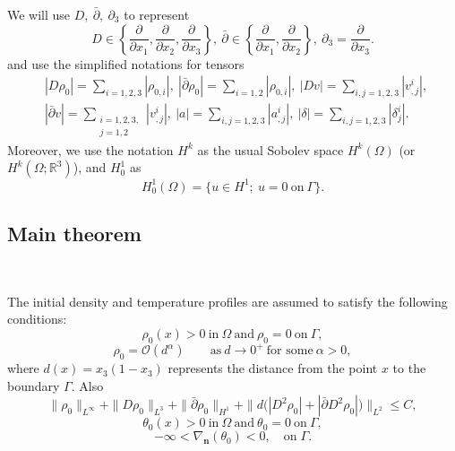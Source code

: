 \documentclass[12pt,a4paper]{amsart}
\numberwithin{equation}{section}
\theoremstyle{plain}
\theoremstyle{definition}
\newcommand{\bpartial}{\bar{\partial}}
\begin{document}
We will use $D,\ \bpartial,\ \partial_3$ to represent
$$
D \in \left\{\frac{\partial}{\partial x_1}, \frac{\partial}{\partial x_2}, \frac{\partial}{\partial x_3} \right\},~
\bpartial\in\left\{\frac{\partial}{\partial x_1}, \frac{\partial}{\partial x_2}\right\},~\partial_3=\frac{\partial}{\partial x_3}.
$$ 
and use the simplified notations for tensors 
\begin{align*}
&|D\rho_0|=\sum\limits_{i=1,2,3}|\rho_{0,i}|,~
|\bpartial\rho_0|=\sum\limits_{i=1,2}|\rho_{0,i}|,~|Dv|=\sum\limits_{i,j=1,2,3}|v^i_{,j}|,~\\
&|\bpartial v|=\sum\limits_{\substack{i=1,2,3,\\ j=1,2}}|v^i_{,j}|,~
|a|=\sum\limits_{i,j=1,2,3}|a^i_{,j}|,~|\delta|=\sum\limits_{i,j=1,2,3}|\delta^i_{j}|.
\end{align*}
Moreover, we use the notation $H^k$ as the usual Sobolev space $H^k(\Omega)$ (or $H^k(\Omega; \mathbb{R}^3)$), and $H^1_0$ as
$$
H^1_0(\Omega)=\{u\in H^1;~ u=0~\text{on}~\Gamma\}.
$$

\subsection{Main theorem}~

The initial density and temperature profiles are assumed to satisfy the following conditions:
\begin{equation}\label{rho1}
	\rho_0(x)>0 \ \text{in}\ \Omega \ \text{and}\ \rho_0=0 \ \text{on}\ \Gamma,
\end{equation}
\begin{equation}
	\label{rho2}
	\rho_0=\mathcal{O} (d^{\alpha}) \qquad \text{as}\ d \rightarrow 0^+ \ \text{for some}\ \alpha>0,
\end{equation} 
	where $d(x)=x_3(1-x_3)$ represents the distance from the point $x$ to the boundary $\Gamma$. Also
 \begin{equation}
	\label{rho3}
	\|\rho_0\|_{L^{\infty}}+\|D \rho_0\|_{L^3}+\|\bpartial \rho_0\|_{H^1}
	+\|d \Big(| D^2 \rho_0 |+|\bpartial D^2 \rho_0|\Big) \|_{L^2}\leq C,
\end{equation}
\begin{equation}
\label{theta1}
\theta_0(x)>0 \ \text{in}\ \Omega \ \text{and}\ \theta_0=0 \ \text{on}\ \Gamma,
\end{equation}
\begin{equation}\label{theta2}
-\infty<\nabla_{\mathbf{n}}(\theta_0)<0, \quad \text{on}\; \Gamma.
\end{equation}
\end{document}
